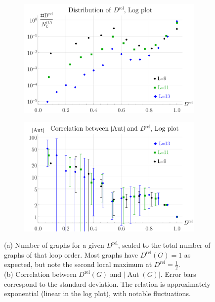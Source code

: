 \documentclass[11pt,a4paper]{article}
\newcommand{\abs}[1]{\lvert #1 \rvert}
\newcommand{\Aut}{\operatorname{Aut}}
\renewcommand{\|}{\rule[-0.4ex]{0.2ex}{1.2em}}
\begin{document}
\begin{figure}[htb]
	\centering
	\begin{subfigure}[b]{.49 \textwidth}
		\includegraphics[width=\textwidth]{Drel_distribution}
		\subcaption{}
		\label{fig:Drel_distribution}
	\end{subfigure}
	\begin{subfigure}[b]{.49 \textwidth}
		\includegraphics[width=\textwidth]{Drel_correlation}
		\subcaption{}
		\label{fig:Drel_correlation}
	\end{subfigure}
	\caption{(a) Number of graphs for a given $D^\text{rel}$, scaled to the  total number of graphs of that loop order. Most graphs have $D^\text{rel}(G)=1$ as expected, but note the second local maximum at $D^\text{rel}=\frac 12$.   \\
	(b) Correlation between $D^\text{rel}(G)$ and $\abs{\Aut(G)}$. Error bars correspond to the standard deviation. The relation is approximately exponential (linear in the log plot), with notable fluctuations. }
	\label{fig:Drel}
\end{figure}
\end{document}
